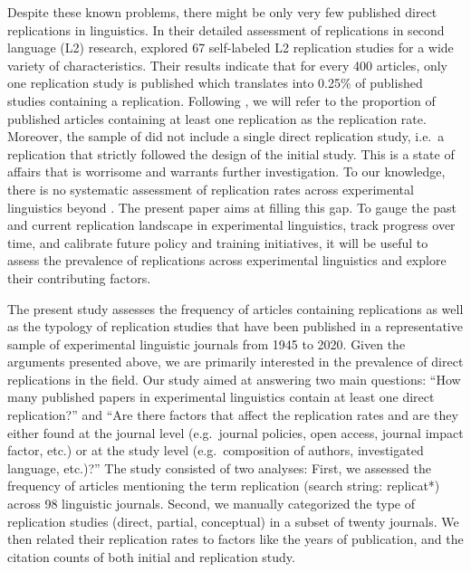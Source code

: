 \documentclass[cm,linguex]{glossa}
\begin{document}
Despite these known problems, there might be only very few published direct replications in linguistics. In their detailed assessment of replications in second language (L2) research, \citet{marsden_replication_2018} explored 67 self-labeled L2 replication studies for a wide variety of characteristics. Their results indicate that for every 400 articles, only one replication study is published which translates into 0.25\% of published studies containing a replication. Following \citet{makel_replications_2012}, we will refer to the proportion of published articles containing at least one replication as the replication rate.
Moreover, the sample of \citet{marsden_replication_2018} did not include a single direct replication study, i.e.~a replication that strictly followed the design of the initial study. This is a state of affairs that is worrisome and warrants further investigation. To our knowledge, there is no systematic assessment of replication rates across experimental linguistics beyond \citet{marsden_replication_2018}. The present paper aims at filling this gap. To gauge the past and current replication landscape in experimental linguistics, track progress over time, and calibrate future policy and training initiatives, it will be useful to assess the prevalence of replications across experimental linguistics and explore their contributing factors.

The present study assesses the frequency of articles containing replications as well as the typology of replication studies that have been published in a representative sample of experimental linguistic journals from 1945 to 2020.
Given the arguments presented above, we are primarily interested in the prevalence of direct replications in the field.
Our study aimed at answering two main questions: ``How many published papers in experimental linguistics contain at least one direct replication?'' and ``Are there factors that affect the replication rates and are they either found at the journal level (e.g.~journal policies, open access, journal impact factor, etc.) or at the study level (e.g.~composition of authors, investigated language, etc.)?''
The study consisted of two analyses:
First, we assessed the frequency of articles mentioning the term replication (search string: replicat*) across 98 linguistic journals.
Second, we manually categorized the type of replication studies (direct, partial, conceptual) in a subset of twenty journals. We then related their replication rates to factors like the years of publication, and the citation counts of both initial and replication study.
\end{document}
